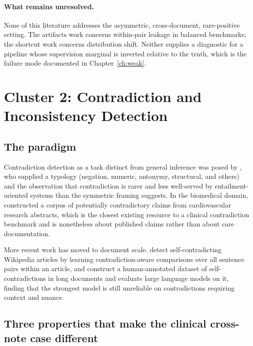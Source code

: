 \paragraph{What remains unresolved.} None of this literature addresses the
asymmetric, cross-document, rare-positive setting. The artifacts work concerns
within-pair leakage in balanced benchmarks; the shortcut work concerns
distribution shift. Neither supplies a diagnostic for a pipeline whose
supervision marginal is inverted relative to the truth, which is the failure
mode documented in Chapter~\ref{ch:weak}.

\section{Cluster 2: Contradiction and Inconsistency Detection}
\label{sec:bg-contradiction}

\subsection{The paradigm}

Contradiction detection as a task distinct from general inference was posed by
\citet{demarneffe2008contradictions}, who supplied a typology (negation,
numeric, antonymy, structural, and others) and the observation that contradiction
is rarer and less well-served by entailment-oriented systems than the symmetric
framing suggests. In the biomedical domain, \citet{alamri2016corpus} constructed
a corpus of potentially contradictory claims from cardiovascular research
abstracts, which is the closest existing resource to a clinical contradiction
benchmark and is nonetheless about published claims rather than about care
documentation.

More recent work has moved to document scale. \citet{hsu2021wikicontradiction}
detect self-contradicting Wikipedia articles by learning contradiction-aware
comparisons over all sentence pairs within an article, and
\citet{li2024contradoc} construct a human-annotated dataset of self-contradictions
in long documents and evaluate large language models on it, finding that the
strongest model is still unreliable on contradictions requiring context and
nuance.

\subsection{Three properties that make the clinical cross-note case different}

